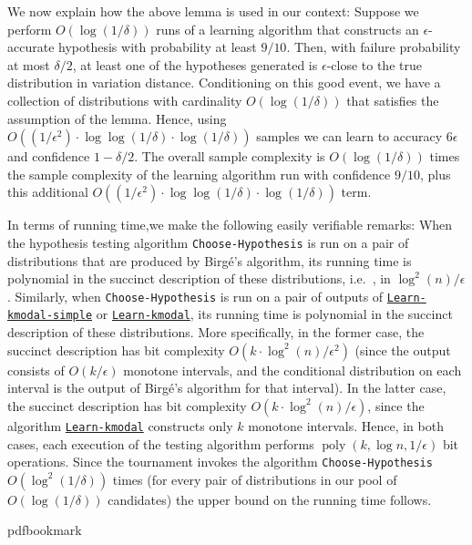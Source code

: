 \documentclass[10pt]{article}
\theoremstyle{definition}
\providecommand{\ie}{i.e.\ }
\numberwithin{equation}{section}
\newcommand{\algorithml}[1]{{\normalfont\texttt{#1}}}
\newcommand{\eps}{\epsilon}
\newcommand{\poly}{\operatorname{poly}}
\begin{document}
We now explain how the above lemma is used in our context: Suppose we perform $O(\log(1/\delta))$ runs of a learning algorithm that constructs an $\eps$-accurate hypothesis with probability at least $9/10$.  Then, with failure probability at most $\delta/2$, at least one of the hypotheses generated is $\eps$-close to the true distribution in variation distance. Conditioning on this good event, we have a collection of distributions with cardinality $O(\log(1/\delta))$ that satisfies the assumption of the lemma. Hence, using
$O\left((1/\eps^2) \cdot \log\log(1/\delta) \cdot \log(1/\delta)\right) $ samples we can learn to accuracy
$6\eps$ and confidence $1-\delta/2$. The overall sample complexity is $O(\log(1/\delta))$ times the sample complexity of the 
{learning algorithm run with confidence $9/10$,} 
plus this additional $O\left((1/\eps^2) \cdot \log\log(1/\delta) \cdot \log(1/\delta)\right)$ term.

In terms of running time,we make the following easily verifiable remarks: When the hypothesis testing algorithm \algorithml{Choose-Hypothesis}  is run on a pair of distributions that are produced by Birg{\'e}'s algorithm, its running time is polynomial in the succinct description of these distributions, \ie, in $\log^2(n) / \eps$. Similarly, when \algorithml{Choose-Hypothesis} is run on a pair of outputs of \hyperref[alg:learn-kmodal-simple]{\algorithml{Learn-kmodal-simple}} or \hyperref[alg:learn-kmodal]{\algorithml{Learn-kmodal}}, its running time is polynomial in the succinct description of these distributions. More specifically, in the former case, the succinct description has bit complexity $O \left( k \cdot \log^2 (n) /\eps^2 \right)$ (since the output consists of $O(k/\eps)$ monotone intervals, and the conditional distribution on each interval is the output of Birg{\'e}'s algorithm for that interval). In the latter case, the succinct description has bit complexity
$O\left( k \cdot \log^2 (n) /\eps \right)$, since the algorithm \hyperref[alg:learn-kmodal]{\algorithml{Learn-kmodal}} constructs  only $k$ monotone intervals. Hence, in both cases, each execution of the testing algorithm performs  $\poly(k, \log n , 1/\eps)$ bit operations. Since the tournament invokes the algorithm \algorithml{Choose-Hypothesis} $O(\log^2(1/\delta))$ times (for every pair of distributions in our pool of $O(\log(1/\delta))$ candidates) the upper bound on the running time follows.
\clearpage
\begingroup\raggedright
%
%
%
%
%
\providecommand{\bibhead}[1]{}
%
\expandafter\ifx\csname pdfbookmark\endcsname\relax%
  \providecommand{\tocrefpdfbookmark}{}
\else\providecommand{\tocrefpdfbookmark}{%
   \hypertarget{tocreferences}{}%
   \pdfbookmark[1]{References}{tocreferences}}%
\fi
\end{document}

